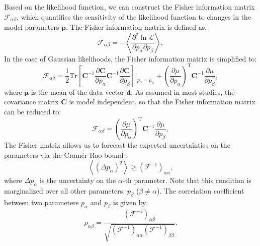 Based on the likelihood function, we can construct the Fisher information matrix $\mathcal{F}_{\alpha\beta}$, which quantifies the sensitivity of the likelihood function to changes in the model parameters $\mathbf{p}$. The Fisher information matrix is defined as:
\begin{equation}
    \mathcal{F}_{\alpha\beta} = -\left\langle \frac{\partial^2 \ln \mathcal{L}}{\partial p_\alpha \partial p_\beta} \right\rangle,
\end{equation}
In the case of Gaussian likelihoods, the Fisher information matrix is simplified to:
\begin{equation}
    \mathcal{F}_{\alpha\beta} = \frac{1}{2} \mathrm{Tr} \left[ \mathbf{C}^{-1} \frac{\partial \mathbf{C}}{\partial p_\alpha} \mathbf{C}^{-1} \frac{\partial \mathbf{C}}{\partial p_\beta} \right]\Bigg|_{p_\alpha = \mu_\alpha} + \left(\frac{\partial \mu}{\partial p_\alpha}\right)^{\mathrm{T}} \mathbf{C}^{-1} \frac{\partial \mu}{\partial p_\beta},
\end{equation}
where $\mathbf{\mu}$ is the mean of the data vector $\mathbf{d}$. 
As assumed in most studies, the covariance matrix $\mathbf{C}$ is model independent, so that the Fisher information matrix can be reduced to:
\begin{equation}
    \mathcal{F}_{\alpha\beta} = \left(\frac{\partial \mu}{\partial p_\alpha}\right)^{\mathrm{T}} \mathbf{C}^{-1} \frac{\partial \mu}{\partial p_\beta},
\end{equation}
The Fisher matrix allows us to forecast the expected uncertainties on the parameters via the Cramér-Rao bound \citep{rao1952advanced}:
\begin{equation}
    \left\langle (\Delta p_\alpha)^2 \right\rangle \geq (\mathcal{F}^{-1})_{\alpha\alpha},
\end{equation}
where $\Delta p_\alpha$ is the uncertainty on the $\alpha$-th parameter. Note that this condition is marginalized over all other parameters, $p_\beta$ ($\beta \neq \alpha$). The correlation coefficient between two parameters $p_\alpha$ and $p_\beta$ is given by:
\begin{equation}
    \rho_{\alpha\beta} = \frac{(\mathcal{F}^{-1})_{\alpha\beta}}{\sqrt{(\mathcal{F}^{-1})_{\alpha\alpha} (\mathcal{F}^{-1})_{\beta\beta}}}.
\end{equation}

